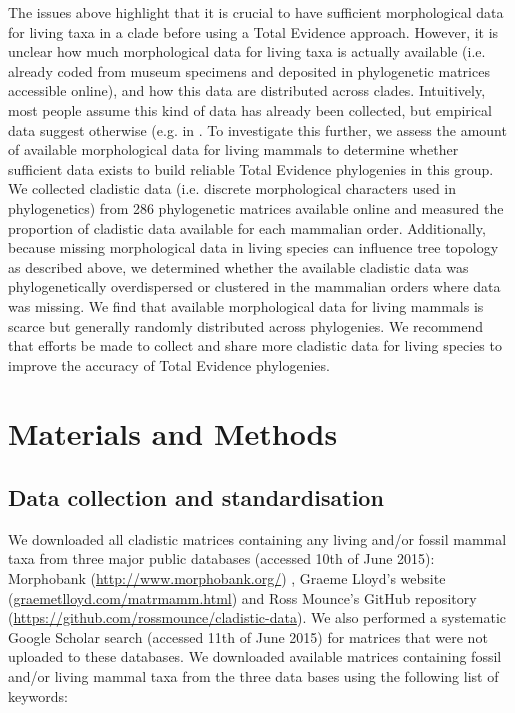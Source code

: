 The issues above highlight that it is crucial to have sufficient morphological data for living taxa in a clade before using a Total Evidence approach.
However, it is unclear how much morphological data for living taxa is actually available (i.e. already coded from museum specimens and deposited in phylogenetic matrices accessible online), and how this data are distributed across clades.
Intuitively, most people assume this kind of data has already been collected, but empirical data suggest otherwise (e.g. in \citep{ronquista2012,slaterphylogenetic2013,beckancient2014}.
To investigate this further, we assess the amount of available morphological data for living mammals to determine whether sufficient data exists to build reliable Total Evidence phylogenies in this group.
We collected cladistic data (i.e. discrete morphological characters used in phylogenetics) from 286 phylogenetic matrices available online and measured the proportion of cladistic data available for each mammalian order.
Additionally, because missing morphological data in living species can influence tree topology as described above, %
we determined whether the available cladistic data was phylogenetically overdispersed or clustered in the mammalian orders where data was missing. 
We find that available morphological data for living mammals is scarce but generally randomly distributed across phylogenies. 
We recommend that efforts be made to collect and share more cladistic data for living species to improve the accuracy of Total Evidence phylogenies.

%
%
\section{Materials and Methods}
\subsection{Data collection and standardisation}
We downloaded all cladistic matrices containing any living and/or fossil mammal taxa from three major public databases (accessed 10th of June 2015): Morphobank (\url{http://www.morphobank.org/}) \citep{morphobank}, Graeme Lloyd's website (\url{graemetlloyd.com/matrmamm.html}) and Ross Mounce's GitHub repository (\url{https://github.com/rossmounce/cladistic-data}).
We also performed a systematic Google Scholar search (accessed 11th of June 2015) for matrices that were not uploaded to these databases. We downloaded available matrices containing fossil and/or living mammal taxa from the three data bases using the following list of keywords:

